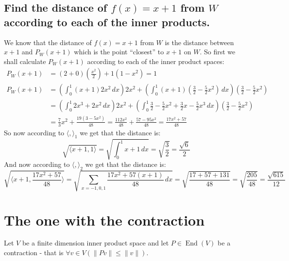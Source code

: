 \documentclass[11pt,a4paper]{article}
\theoremstyle{plain}
\DeclareMathOperator{\End}{End}
\begin{document}
	\subsection{Find the distance of $f(x)=x+1$ from $W$ according to each of
	the inner products.}
	We know that the distance of $f(x)=x+1$ from $W$ is the distance between
	$x+1$ and $P_W(x+1)$ which is the point ``closest'' to $x+1$ on $W$. So
	first we shall calculate $P_W(x+1)$ according to each of the inner product
	spaces:
	\begin{align*}
		P_W(x+1) &= \left(2+0\right)\left(\frac{x^2}{2}\right) + 1
		\left(1-x^2\right) = 1 \\
		P_W(x+1) &= \left(\int_{0}^{1}{(x+1)2x^2\,dx}\right) 2x^2 + 
		\left(\int_{0}^{1}{(x+1)\left(\frac{3}{2} - \frac{5}{2}x^2\right)\,dx}
		\right) \left(\frac{3}{2}-\frac{5}{2}x^2\right) \\ &=
		\left(\int_{0}^{1}{2x^3+2x^2\,dx}\right) 2x^2 +
		\left(\int_{0}^{1}{\frac{3}{2} - \frac{5}{2}x^2 + \frac{3}{2}x - 
		\frac{5}{2}x^3\,dx}\right) \left(\frac{3}{2}-\frac{5}{2}x^2\right) \\ &=
		\frac{7}{3}x^2 + \frac{19(3-5x^2)}{48} =
		\frac{112x^2}{48} + \frac{57 - 95x^2}{48} = \frac{17x^2+57}{48}
	\end{align*}
	So now according to $\langle ,\rangle_1$ we get that the distance is:
	\[
		\sqrt{\langle x+1,1\rangle} = \sqrt{\int_{0}^{1}{x+1\,dx}} = 
		\sqrt{\frac{3}{2}} = \frac{\sqrt{6}}{2}
	\]
	And now according to $\langle ,\rangle_2$ we get that the distance is:
	\[
		\sqrt{\langle x+1, \frac{17x^2+57}{48}\rangle} = 
		\sqrt{\sum_{x=-1,0,1}{\frac{17x^2+57(x+1)}{48}\,dx}} = 
		\sqrt{\frac{17+57+131}{48}} = \sqrt{\frac{205}{48}} = 
		\frac{\sqrt{615}}{12}
	\]
	\newpage

	\section{The one with the contraction}
	Let $V$ be a finite dimension inner product space and let $P\in\End(V)$ 
	be a contraction - that is $\forall v\in V(\|Pv\|\le\|v\|)$.
	
\end{document}
